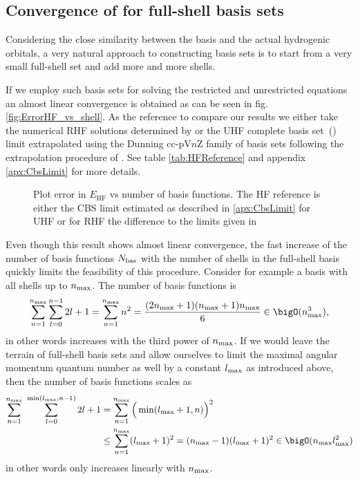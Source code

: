 \subsection{Convergence of \HF for full-shell \CS basis sets}
\defineabbr{CBS}{CBS\xspace}{complete basis set limit}

Considering the close similarity between the \CS basis and the actual
hydrogenic orbitals,
a very natural approach to constructing \CS basis sets is to
start from a very small full-shell set and add more and more shells.

If we employ such basis sets for solving the restricted and unrestricted
\HF equations an almost linear convergence is obtained
as can be seen in fig. \vref{fig:ErrorHF_vs_shell}.
As the reference to compare our \CS results we either
take the numerical RHF solutions determined by \citet{Morgon1997} or
the UHF complete basis set~(\CBS) limit extrapolated using the Dunning
cc-pV$n$Z family of basis sets following the extrapolation procedure of
\citet{Jensen2005}.
See table \vref{tab:HFReference} and appendix \vref{apx:CbsLimit} for more details.



\begin{figure}
	\centering
	\caption{Plot error in $E_\text{HF}$ vs number of basis functions.
		The HF reference is either the CBS limit estimated as described in
		\vref{apx:CbsLimit} for UHF
		or for RHF the difference to the limits given in  \cite{Morgon1997}
}
	\label{fig:ErrorHF_vs_shell}
\end{figure}

Even though this result shows almost linear convergence,
the fast increase of the number of basis functions $N_\text{bas}$ with the
number of shells in the full-shell \CS basis
quickly limits the feasibility of this procedure.
Consider for example a \CS basis with all shells up to $n_\text{max}$.
The number of basis functions is
\[ \sum_{n=1}^{\nmax} \sum_{l=0}^{n-1} 2l + 1 = \sum_{n=1}^{\nmax} n^2
	= \frac{(2\nmax+1)(\nmax+1)\nmax}{6}
	\in \bigO(\nmax^3),
\]
in other words increases with the third power of $n_\text{max}$.
If we would leave the terrain of full-shell basis sets
and allow ourselves to limit the maximal angular momentum quantum
number as well by a constant $l_\text{max}$ as introduced above,
then the number of basis functions scales as
\begin{align*}
\sum_{n=1}^{\nmax} \ \sum_{l=0}^{\min(\lmax, n-1)} 2l + 1
	&= \sum_{n=1}^{\nmax} \Big( \min(\lmax+1, n) \Big)^2 \\
	&\le \sum_{n=1}^{\nmax} (\lmax+1)^2 = (\nmax-1) (\lmax+1)^2
	\in \bigO(\nmax \lmax^2)
\end{align*}
in other words only increases linearly with $n_\text{max}$.

